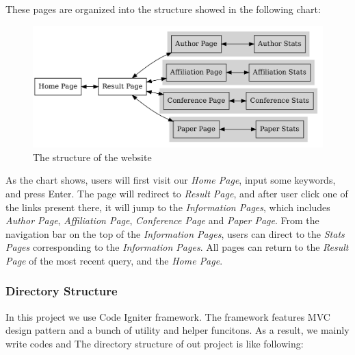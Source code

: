 \documentclass[a4paper, 10pt]{article}
\begin{document}
These pages are organized into the structure showed in the following chart:
\begin{figure}[H]
  \centering
  \includegraphics[width=\textwidth]{web_struct.png}
  \caption{The structure of the website}
  \label{fig:web_struct}
\end{figure}
As the chart shows, users will first visit our \textit{Home Page}, input some keywords, and press Enter. The page will redirect to \textit{Result Page}, and after user click one of the links present there, it will jump to the \textit{Information Pages}, which includes \textit{Author Page}, \textit{Affiliation Page}, \textit{Conference Page} and \textit{Paper Page}. From the navigation bar on the top of the \textit{Information Pages}, users can direct to the \textit{Stats Pages} corresponding to the \textit{Information Pages}. All pages can return to the \textit{Result Page} of the most recent query, and the \textit{Home Page}.

\subsubsection{Directory Structure}
In this project we use Code Igniter framework. The framework features MVC design pattern and a bunch of utility and helper funcitons. As a result, we mainly write codes and 
The directory structure of out project is like following:
\end{document}
